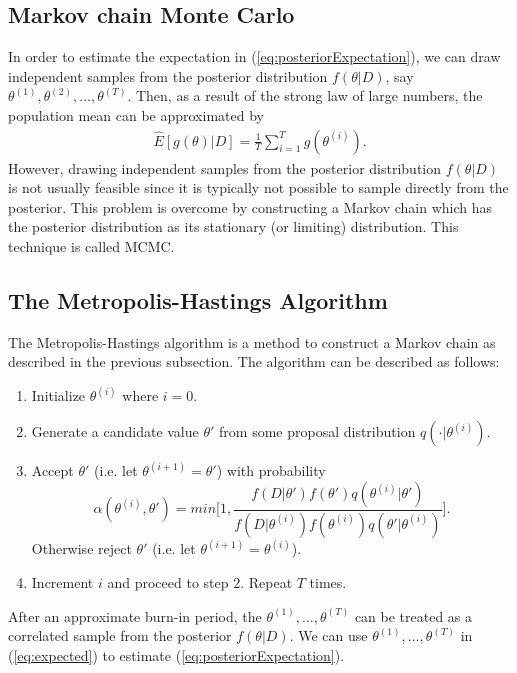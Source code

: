 \documentclass[12pt,openany]{article}
\theoremstyle{remark} %
\theoremstyle{definition} %
\begin{document}
\subsection{Markov chain Monte Carlo }

In order to estimate the expectation in (\ref{eq:posteriorExpectation}), we can draw independent samples from the posterior distribution $f(\theta|D)$, say $\theta^{(1)}, \theta^{(2)}, \ldots, \theta^{(T)}$. Then, as a result of the strong law of large numbers, the population mean can be approximated by
\begin{align} \label{eq:expected}
\hat{E}[g(\theta)|D] =\frac{1}{T} \sum_{i=1}^{T}  g(\theta^{(i)}).
\end{align}
However, drawing independent samples from the posterior distribution $f(\theta|D)$ is not usually feasible since it is typically not possible to sample directly from the posterior. This problem is overcome by constructing a Markov chain which has the posterior distribution as its stationary (or limiting) distribution. This technique is called MCMC. 

\subsection{The Metropolis-Hastings Algorithm}

The Metropolis-Hastings algorithm is a method to construct a Markov chain as described in the previous subsection. The algorithm can be described as follows:
\begin{enumerate}
	\item Initialize $\theta^{(i)}$ where $i=0$.
	\item Generate a candidate value $\theta'$ from some proposal distribution $q(\cdot|\theta^{(i)})$.
	\item Accept $\theta'$ (i.e. let $\theta^{(i+1)} = \theta'$) with probability
	\[
	\alpha(\theta^{(i)},\theta') = min \bigg[ 1,\frac{f(D|\theta') f(\theta') q(\theta^{(i)}|\theta')}{f(D|\theta^{(i)}) f(\theta^{(i)}) q(\theta'|\theta^{(i)})} \bigg].
	\]
Otherwise reject $\theta'$ (i.e. let $\theta^{(i+1)} = \theta^{(i)}$).
	\item Increment $i$ and proceed to step $2$. Repeat $T$ times.
\end{enumerate}
After an approximate burn-in period, the $\theta^{(1)}, \ldots, \theta^{(T)}$ can be treated as a correlated sample from the posterior $f(\theta|D)$. We can use $\theta^{(1)}, \ldots, \theta^{(T)}$ in  (\ref{eq:expected}) to estimate (\ref{eq:posteriorExpectation}).
\end{document}
